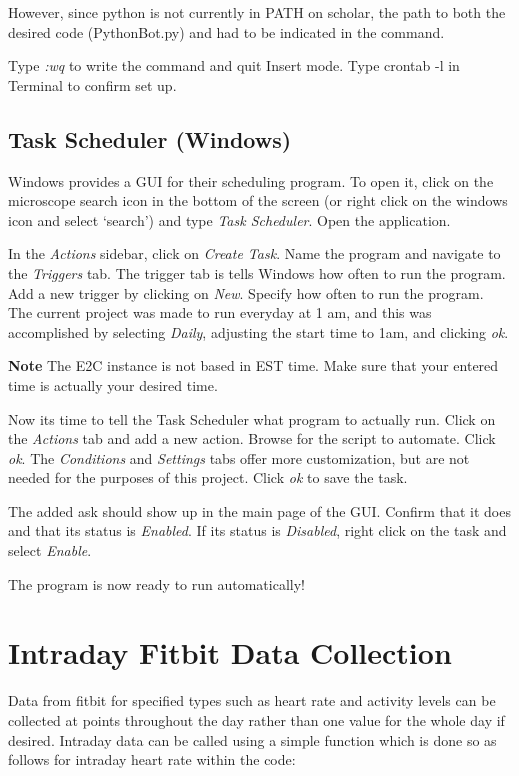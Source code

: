 \documentclass[]{book}
\begin{document}
However, since python is not currently in PATH on scholar, the path to
both the desired code (PythonBot.py) and had to be indicated in the
command.

Type \emph{:wq} to write the command and quit Insert mode. Type crontab
-l in Terminal to confirm set up.

\subsection{Task Scheduler (Windows)}\label{task-scheduler-windows}

Windows provides a GUI for their scheduling program. To open it, click
on the microscope search icon in the bottom of the screen (or right
click on the windows icon and select `search') and type \emph{Task
Scheduler}. Open the application.

In the \emph{Actions} sidebar, click on \emph{Create Task}. Name the
program and navigate to the \emph{Triggers} tab. The trigger tab is
tells Windows how often to run the program. Add a new trigger by
clicking on \emph{New}. Specify how often to run the program. The
current project was made to run everyday at 1 am, and this was
accomplished by selecting \emph{Daily}, adjusting the start time to 1am,
and clicking \emph{ok}.

\textbf{Note} The E2C instance is not based in EST time. Make sure that
your entered time is actually your desired time.

Now its time to tell the Task Scheduler what program to actually run.
Click on the \emph{Actions} tab and add a new action. Browse for the
script to automate. Click \emph{ok}. The \emph{Conditions} and
\emph{Settings} tabs offer more customization, but are not needed for
the purposes of this project. Click \emph{ok} to save the task.

The added ask should show up in the main page of the GUI. Confirm that
it does and that its status is \emph{Enabled}. If its status is
\emph{Disabled}, right click on the task and select \emph{Enable}.

The program is now ready to run automatically!

\section{Intraday Fitbit Data
Collection}\label{intraday-fitbit-data-collection}

Data from fitbit for specified types such as heart rate and activity
levels can be collected at points throughout the day rather than one
value for the whole day if desired. Intraday data can be called using a
simple function which is done so as follows for intraday heart rate
within the code:
\end{document}
